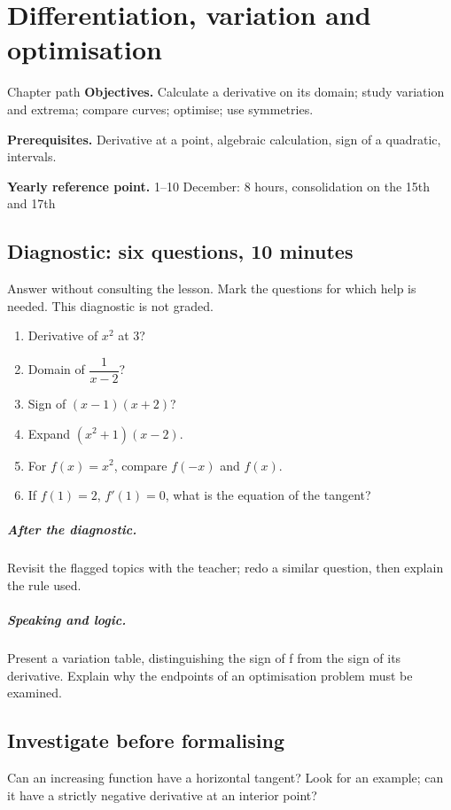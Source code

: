 \chapter{Differentiation, variation and optimisation}\label{C06}
\begin{repere}{Chapter path}
\textbf{Objectives.} Calculate a derivative on its domain; study variation and extrema; compare curves; optimise; use symmetries.

\textbf{Prerequisites.} Derivative at a point, algebraic calculation, sign of a quadratic, intervals.

\textbf{Yearly reference point.} 1--10 December: 8 hours, consolidation on the 15th and 17th\end{repere}
\section*{Diagnostic: six questions, 10 minutes}\label{C06-D}
Answer without consulting the lesson. Mark the questions for which help is needed. This diagnostic is not graded.
\begin{enumerate}
\item Derivative of $x^2$ at 3?
\item Domain of $\dfrac{1}{x-2}$?
\item Sign of $(x-1)(x+2)$?
\item Expand $(x^2+1)(x-2)$.
\item For $f(x)=x^2$, compare $f(-x)$ and $f(x)$.
\item If $f(1)=2$, $f\prime(1)=0$, what is the equation of the tangent?
\end{enumerate}
\paragraph{After the diagnostic.} Revisit the flagged topics with the teacher; redo a similar question, then explain the rule used.
\paragraph{Speaking and logic.} Present a variation table, distinguishing the sign of f from the sign of its derivative. Explain why the endpoints of an optimisation problem must be examined.
\clearpage
\section*{Investigate before formalising}\label{C06-RECH}
Can an increasing function have a horizontal tangent? Look for an example; can it have a strictly negative derivative at an interior point?
